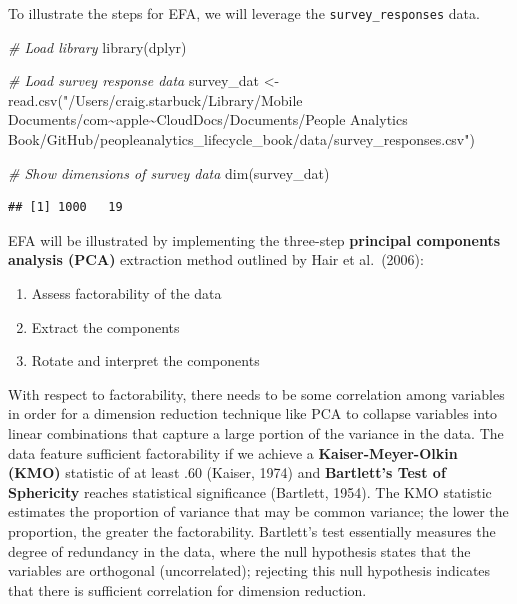 \documentclass[
]{book}
\newenvironment{Shaded}{\begin{snugshade}}{\end{snugshade}}
\newcommand{\CommentTok}[1]{\textcolor[rgb]{0.56,0.35,0.01}{\textit{#1}}}
\newcommand{\FunctionTok}[1]{\textcolor[rgb]{0.00,0.00,0.00}{#1}}
\newcommand{\NormalTok}[1]{#1}
\newcommand{\OtherTok}[1]{\textcolor[rgb]{0.56,0.35,0.01}{#1}}
\newcommand{\StringTok}[1]{\textcolor[rgb]{0.31,0.60,0.02}{#1}}
\providecommand{\tightlist}{%
  \setlength{\itemsep}{0pt}\setlength{\parskip}{0pt}}
\begin{document}
To illustrate the steps for EFA, we will leverage the \texttt{survey\_responses} data.

\begin{Shaded}
\begin{Highlighting}[]
\CommentTok{\# Load library}
\FunctionTok{library}\NormalTok{(dplyr)}

\CommentTok{\# Load survey response data}
\NormalTok{survey\_dat }\OtherTok{\textless{}{-}} \FunctionTok{read.csv}\NormalTok{(}\StringTok{"/Users/craig.starbuck/Library/Mobile Documents/com\textasciitilde{}apple\textasciitilde{}CloudDocs/Documents/People Analytics Book/GitHub/peopleanalytics\_lifecycle\_book/data/survey\_responses.csv"}\NormalTok{)}

\CommentTok{\# Show dimensions of survey data}
\FunctionTok{dim}\NormalTok{(survey\_dat)}
\end{Highlighting}
\end{Shaded}

\begin{verbatim}
## [1] 1000   19
\end{verbatim}

EFA will be illustrated by implementing the three-step \textbf{principal components analysis (PCA)} extraction method outlined by Hair et al.~(2006):

\begin{enumerate}
\def\labelenumi{\arabic{enumi}.}
\tightlist
\item
  Assess factorability of the data
\item
  Extract the components
\item
  Rotate and interpret the components
\end{enumerate}

With respect to factorability, there needs to be some correlation among variables in order for a dimension reduction technique like PCA to collapse variables into linear combinations that capture a large portion of the variance in the data. The data feature sufficient factorability if we achieve a \textbf{Kaiser-Meyer-Olkin (KMO)} statistic of at least \(.60\) (Kaiser, 1974) and \textbf{Bartlett's Test of Sphericity} reaches statistical significance (Bartlett, 1954). The KMO statistic estimates the proportion of variance that may be common variance; the lower the proportion, the greater the factorability. Bartlett's test essentially measures the degree of redundancy in the data, where the null hypothesis states that the variables are orthogonal (uncorrelated); rejecting this null hypothesis indicates that there is sufficient correlation for dimension reduction.
\end{document}
